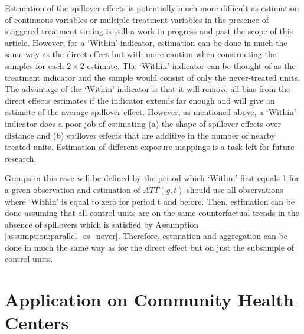 \documentclass[11pt]{article}
\begin{document}
Estimation of the spillover effects is potentially much more difficult as estimation of continuous variables or multiple treatment variables in the presence of staggered treatment timing is still a work in progress and past the scope of this article. However, for a `Within' indicator, estimation can be done in much the same way as the direct effect but with more caution when constructing the samples for each $2 \times 2$ estimate. The `Within' indicator can be thought of as the treatment indicator and the sample would consist of only the never-treated units. The advantage of the `Within' indicator is that it will remove all bias from the direct effects estimates if the indicator extends far enough and will give an estimate of the average spillover effect. However, as mentioned above, a `Within' indicator does a poor job of estimating (a) the shape of spillover effects over distance and (b) spillover effects that are additive in the number of nearby treated units. Estimation of different exposure mappings is a task left for future research. 

Groups in this case will be defined by the period which `Within' first equals 1 for a given observation and estimation of $ATT(g,t)$ should use all observations where `Within' is equal to zero for period t and before. Then, estimation can be done assuming that all control units are on the same counterfactual trends in the absence of spillovers which is satisfied by Assumption \ref{assumption:parallel_es_never}. Therefore, estimation and aggregation can be done in much the same way as for the direct effect but on just the subsample of control units.


\section{Application on Community Health Centers}\label{sec:chc}
\end{document}
